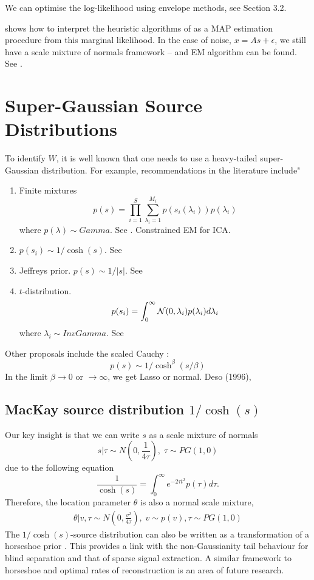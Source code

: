 \documentclass[11pt]{article}%
\begin{document}
We can optimise the log-likelihood using envelope methods, see Section 3.2.

\citet{mackay1996maximum} shows how to interpret the heuristic algorithms of \citet{bell1995information} as a MAP estimation procedure from this marginal likelihood. In the case of noise, $x = As + \epsilon$, we still have a scale mixture of normals framework -- and EM algorithm can be found. See \citep{fevotte2004bayesian}.

\section{Super-Gaussian Source Distributions}
To identify $W$, it is well known that one needs to use a heavy-tailed super-Gaussian distribution. For example, recommendations in the literature include" 
\begin{enumerate}
	\item Finite mixtures
	$$
	p(s) = \prod_{i=1}^S \sum_{\lambda_i=1}^{M_i} p(s_i(\lambda_i)) p(\lambda_i)
	$$
	where $p(\lambda) \sim Gamma$. See \citet{hinton2001new}. Constrained EM for ICA.
	\item $p(s_i) \sim 1/\cosh(s)$. See \citep{mackay1996maximum}
	\item Jeffreys prior. $p(s) \sim 1/|s|$. See \citep{fevotte2006blind}
	\item $t$-distribution. $$p(s_i) = \int_0^\infty \mathcal{N}(0, \lambda_i) p(\lambda_i) d\lambda_i $$
	where $\lambda_i \sim InvGamma$. See \citep{fevotte2004bayesian}
\end{enumerate}
Other proposals include the scaled Cauchy \citep{mackay1996maximum}:
$$
p(s) \sim 1/\cosh^\beta(s/\beta)
$$
In the limit $\beta \rightarrow 0$ or $\rightarrow \infty$, we get Lasso or normal. Deso (1996), 



\subsection{MacKay source  distribution $ 1/\cosh (s)$}

Our key insight is that we can  write $s$ as a scale mixture of normals
\begin{equation}
s|\tau \sim N(0, \frac{1}{4\tau}),\; \tau \sim PG(1,0)
\end{equation}
due to the following equation
\begin{equation}
\frac{1}{\cosh(s)} = \int_{0}^{\infty} e^{-2\tau t^2}p(\tau) d\tau.
\end{equation}
Therefore, the location parameter $\theta$ is also a normal scale mixture,
\begin{align}
\theta|v,\tau \sim N\left(0, \frac{v^2}{4\tau}\right),\; v\sim p(v), \tau\sim PG(1,0)
\end{align}
The $ 1 /\cosh (s)$-source distribution can also be written as a transformation of a horseshoe prior \citep{carvalho2010horseshoe}.
This provides a link with the non-Gaussianity tail behaviour for blind separation and that of sparse signal extraction. A similar framework to horseshoe and optimal rates of reconstruction is an area of future research. 
\end{document}
